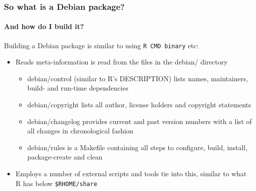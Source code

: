 \documentclass[smaller,compress]{beamer}
\begin{document}
\begin{frame}
  \frametitle{So what is a Debian package?} %
  \framesubtitle{And how do I build it?}

  Building a Debian package is similar to using \texttt{R
    CMD binary} etc:
  \begin{itemize} 
  \item Reads meta-information is read from the files in the debian/ directory
    \begin{itemize} 
    \item debian/control (similar to R's DESCRIPTION) lists names,
      maintainers, build- and run-time dependencies
    \item debian/copyright lists all author, license holders and copyright
      statements 
    \item debian/changelog provides current and past version numbers with a
      list of  all changes in chronological fashion
    \item debian/rules is a Makefile containing all steps to configure,
      build, install, package-create and clean
    \end{itemize}
  \item Employs a number of external scripts and tools tie into this,
  similar to what R has below \texttt{\$RHOME/share}
  \end{itemize}
\end{frame}
\end{document}
